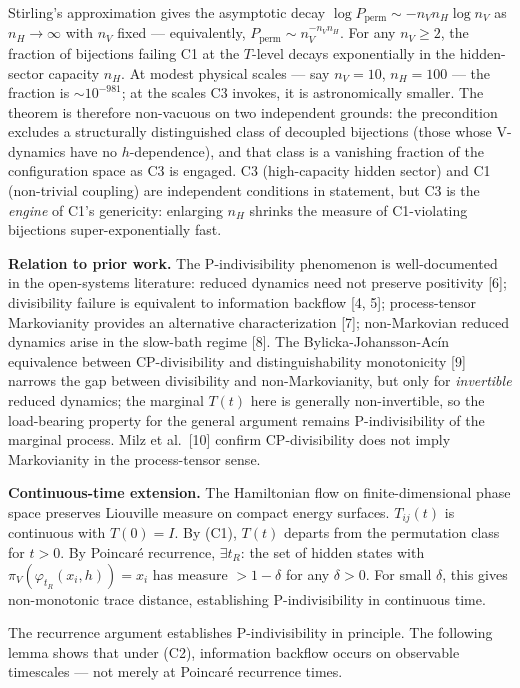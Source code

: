 \documentclass[
]{article}
\begin{document}
Stirling's approximation gives the asymptotic decay
\(\log P_{\text{perm}} \sim -n_V n_H \log n_V\) as \(n_H \to \infty\)
with \(n_V\) fixed --- equivalently,
\(P_{\text{perm}} \sim n_V^{-n_V n_H}\). For any \(n_V \geq 2\), the
fraction of bijections failing C1 at the \(T\)-level decays
exponentially in the hidden-sector capacity \(n_H\). At modest physical
scales --- say \(n_V = 10\), \(n_H = 100\) --- the fraction is
\(\sim 10^{-981}\); at the scales C3 invokes, it is astronomically
smaller. The theorem is therefore non-vacuous on two independent
grounds: the precondition excludes a structurally distinguished class of
decoupled bijections (those whose V-dynamics have no \(h\)-dependence),
and that class is a vanishing fraction of the configuration space as C3
is engaged. C3 (high-capacity hidden sector) and C1 (non-trivial
coupling) are independent conditions in statement, but C3 is the
\emph{engine} of C1's genericity: enlarging \(n_H\) shrinks the measure
of C1-violating bijections super-exponentially fast.

\textbf{Relation to prior work.} The P-indivisibility phenomenon is
well-documented in the open-systems literature: reduced dynamics need
not preserve positivity {[}6{]}; divisibility failure is equivalent to
information backflow {[}4, 5{]}; process-tensor Markovianity provides an
alternative characterization {[}7{]}; non-Markovian reduced dynamics
arise in the slow-bath regime {[}8{]}. The Bylicka-Johansson-Acín
equivalence between CP-divisibility and distinguishability monotonicity
{[}9{]} narrows the gap between divisibility and non-Markovianity, but
only for \emph{invertible} reduced dynamics; the marginal \(T(t)\) here
is generally non-invertible, so the load-bearing property for the
general argument remains P-indivisibility of the marginal process. Milz
et al.~{[}10{]} confirm CP-divisibility does not imply Markovianity in
the process-tensor sense.

\textbf{Continuous-time extension.} The Hamiltonian flow on
finite-dimensional phase space preserves Liouville measure on compact
energy surfaces. \(T_{ij}(t)\) is continuous with \(T(0) = I\). By (C1),
\(T(t)\) departs from the permutation class for \(t > 0\). By Poincaré
recurrence, \(\exists t_R\): the set of hidden states with
\(\pi_V(\varphi_{t_R}(x_i, h)) = x_i\) has measure \(> 1 - \delta\) for
any \(\delta > 0\). For small \(\delta\), this gives non-monotonic trace
distance, establishing P-indivisibility in continuous time.

The recurrence argument establishes P-indivisibility in principle. The
following lemma shows that under (C2), information backflow occurs on
observable timescales --- not merely at Poincaré recurrence times.
\end{document}
